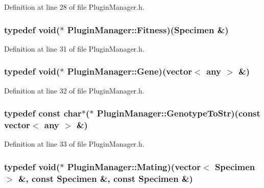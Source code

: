 Definition at line 28 of file PluginManager.h.\hypertarget{classPluginManager_74536c0cfee914f6b592d185e9d8b004}{
\subsubsection{\setlength{\rightskip}{0pt plus 5cm}typedef void($\ast$ {\bf PluginManager::Fitness})({\bf Specimen} \&)}}
\label{classPluginManager_74536c0cfee914f6b592d185e9d8b004}




Definition at line 31 of file PluginManager.h.\hypertarget{classPluginManager_fbd27663f74cd22c439cc0a365094d79}{
\subsubsection{\setlength{\rightskip}{0pt plus 5cm}typedef void($\ast$ {\bf PluginManager::Gene})(vector$<$ any $>$ \&)}}
\label{classPluginManager_fbd27663f74cd22c439cc0a365094d79}




Definition at line 32 of file PluginManager.h.\hypertarget{classPluginManager_ed40a705dc64b5ebe14b9a29f2828241}{
\subsubsection{\setlength{\rightskip}{0pt plus 5cm}typedef const char$\ast$($\ast$ {\bf PluginManager::GenotypeToStr})(const vector$<$ any $>$ \&)}}
\label{classPluginManager_ed40a705dc64b5ebe14b9a29f2828241}




Definition at line 33 of file PluginManager.h.\hypertarget{classPluginManager_b2707706d35a521a1c9c0c525b20b3a9}{
\subsubsection{\setlength{\rightskip}{0pt plus 5cm}typedef void($\ast$ {\bf PluginManager::Mating})(vector$<$ {\bf Specimen} $>$ \&, const {\bf Specimen} \&, const {\bf Specimen} \&)}}
\label{classPluginManager_b2707706d35a521a1c9c0c525b20b3a9}




